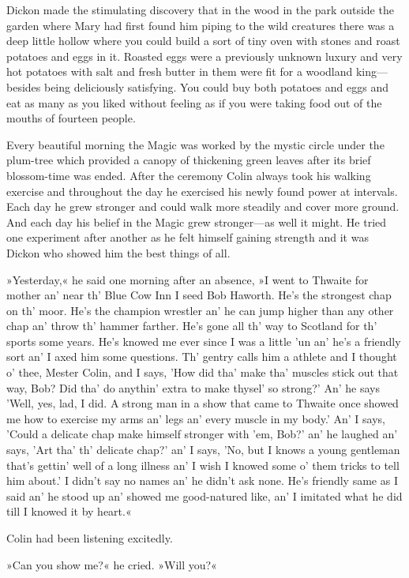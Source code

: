 Dickon made the stimulating discovery that in the wood in the park outside the garden where Mary had first found him piping to the wild creatures there was a deep little hollow where you could build a sort of tiny oven with stones and roast potatoes and eggs in it. Roasted eggs were a previously unknown luxury and very hot potatoes with salt and fresh butter in them were fit for a woodland king—besides being deliciously satisfying. You could buy both potatoes and eggs and eat as many as you liked without feeling as if you were taking food out of the mouths of fourteen people.

Every beautiful morning the Magic was worked by the mystic circle under the plum-tree which provided a canopy of thickening green leaves after its brief blossom-time was ended. After the ceremony Colin always took his walking exercise and throughout the day he exercised his newly found power at intervals. Each day he grew stronger and could walk more steadily and cover more ground. And each day his belief in the Magic grew stronger—as well it might. He tried one experiment after another as he felt himself gaining strength and it was Dickon who showed him the best things of all.

»Yesterday,« he said one morning after an absence, »I went to Thwaite for mother an' near th' Blue Cow Inn I seed Bob Haworth. He's the strongest chap on th' moor. He's the champion wrestler an' he can jump higher than any other chap an' throw th' hammer farther. He's gone all th' way to Scotland for th' sports some years. He's knowed me ever since I was a little 'un an' he's a friendly sort an' I axed him some questions. Th' gentry calls him a athlete and I thought o' thee, Mester Colin, and I says, 'How did tha' make tha' muscles stick out that way, Bob? Did tha' do anythin' extra to make thysel' so strong?' An' he says 'Well, yes, lad, I did. A strong man in a show that came to Thwaite once showed me how to exercise my arms an' legs an' every muscle in my body.' An' I says, 'Could a delicate chap make himself stronger with 'em, Bob?' an' he laughed an' says, 'Art tha' th' delicate chap?' an' I says, 'No, but I knows a young gentleman that's gettin' well of a long illness an' I wish I knowed some o' them tricks to tell him about.' I didn't say no names an' he didn't ask none. He's friendly same as I said an' he stood up an' showed me good-natured like, an' I imitated what he did till I knowed it by heart.«

Colin had been listening excitedly.

»Can you show me?« he cried. »Will you?«

